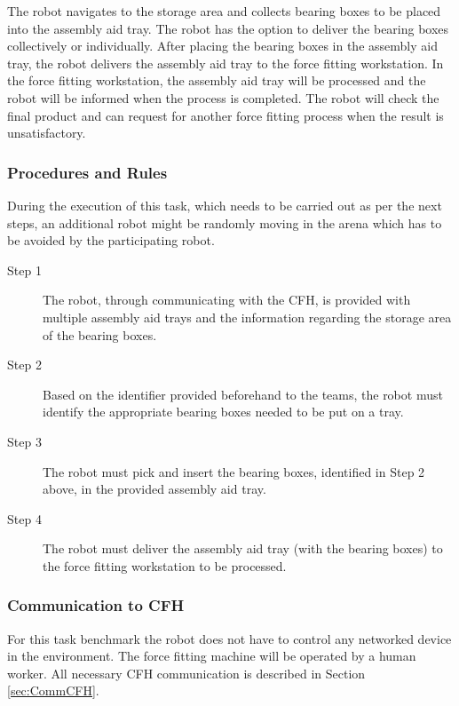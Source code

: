 The robot navigates to the storage area and collects bearing boxes to be placed into the assembly aid tray.
The robot has the option to deliver the bearing boxes collectively or individually.
After placing the bearing boxes in the assembly aid tray, the robot delivers the assembly aid tray to the force fitting workstation. 
In the force fitting workstation, the assembly aid tray will be processed and the robot will be informed when the process is completed.
The robot will check the final product and can request for another force fitting process when the result is unsatisfactory.

\subsubsection{Procedures and Rules}
\label{sssec:TaskAssemblyAidTrayProcedures}

During the execution of this task, which needs to be carried out as per the next steps, an additional robot might be randomly moving in the arena which has to be avoided by the participating robot. 

\begin{description}
     \item [Step 1] The robot, through communicating with the CFH, is provided with multiple assembly aid trays and the information regarding the storage area of the bearing boxes.
     \item [Step 2] Based on the identifier provided beforehand to the teams, the robot must identify the appropriate bearing boxes needed to be put on a tray.
     \item [Step 3] The robot must pick and insert the bearing boxes, identified in Step 2 above, in the provided assembly aid tray.
     \item [Step 4] The robot must deliver the assembly aid tray (with the bearing boxes) to the force fitting workstation to be processed.
\end{description}

\subsubsection{Communication to CFH}
\label{sssec:CommCFH}

For this task benchmark the robot does not have to control any networked device in the environment. The force fitting machine will be operated by a human worker. All necessary CFH communication is described in Section \ref{sec:CommCFH}.

